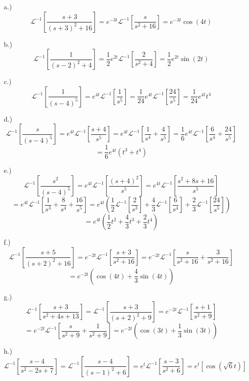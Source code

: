 \documentclass[12pt]{article}
\newcommand{\bracks}[1]{\left[#1\right]}
\newcommand{\parns}[1]{\left(#1\right)}
\newcommand{\lpi}{\mathcal{L}^{-1}}
\begin{document}
\begin{itemize}
    \item [a.)] \[\lpi\bracks{\frac{s+3}{(s+3)^2+16}}=e^{-3t}\lpi\bracks{\frac{s}{s^2+16}}=e^{-3t}\cos(4t)\]

    \item [b.)] \[\lpi\bracks{\frac{1}{(s-2)^2+4}}=\frac{1}{2}e^{2t}\lpi\bracks{\frac{2}{s^2+4}}=\frac{1}{2}e^{2t}\sin(2t)\]

    \item [c.)] \[\lpi\bracks{\frac{1}{(s-4)^5}}=e^{4t}\lpi\bracks{\frac{1}{s^5}}=\frac{1}{24}e^{4t}\lpi\bracks{\frac{24}{s^5}}=\frac{1}{24}e^{4t}t^4\]

    \item [d.)] \[\lpi\bracks{\frac{s}{(s-4)^5}}=e^{4t}\lpi\bracks{\frac{s+4}{s^5}}=e^{4t}\lpi\bracks{\frac{1}{s^4}+\frac{4}{s^5}}=\frac{1}{6}e^{4t}\lpi\bracks{\frac{6}{s^4}+\frac{24}{s^5}}\]
    \[=\frac{1}{6}e^{4t}(t^3+t^4)\]

    \item [e.)] \[\lpi\bracks{\frac{s^2}{(s-4)^5}}=e^{4t}\lpi\bracks{\frac{(s+4)^2}{s^5}}=e^{4t}\lpi\bracks{\frac{s^2+8s+16}{s^5}}\]
    \[=e^{4t}\lpi\bracks{\frac{1}{s^3}+\frac{8}{s^4}+\frac{16}{s^5}}=e^{4t}\parns{\frac{1}{2}\lpi\bracks{\frac{2}{s^3}}+\frac{4}{3}\lpi\bracks{\frac{6}{s^4}}+\frac{2}{3}\lpi\bracks{\frac{24}{s^5}}}\]
    \[=e^{4t}\parns{\frac{1}{2}t^2+\frac{4}{3}t^3+\frac{2}{3}t^4}\]

    \item [f.)] \[\lpi\bracks{\frac{s+5}{(s+2)^2+16}}=e^{-2t}\lpi\bracks{\frac{s+3}{s^2+16}}=e^{-2t}\lpi\bracks{\frac{s}{s^2+16}+\frac{3}{s^2+16}}\]
    \[=e^{-2t}\parns{\cos(4t)+\frac{4}{3}\sin(4t)}\]

    \item [g.)] \[\lpi\bracks{\frac{s+3}{s^2+4s+13}}=\lpi\bracks{\frac{s+3}{(s+2)^2+9}}=e^{-2t}\lpi\bracks{\frac{s+1}{s^2+9}}\]
    \[=e^{-2t}\lpi\bracks{\frac{s}{s^2+9}+\frac{1}{s^2+9}}=e^{-2t}\parns{\cos(3t)+\frac{1}{3}\sin(3t)}\]

    \item [h.)] \[\lpi\bracks{\frac{s-4}{s^2-2s+7}}=\lpi\bracks{\frac{s-4}{(s-1)^2+6}}=e^t\lpi\bracks{\frac{s-3}{s^2+6}}=e^t\bracks{\cos\parns{\sqrt6 t}}\]
\end{itemize}
\end{document}
